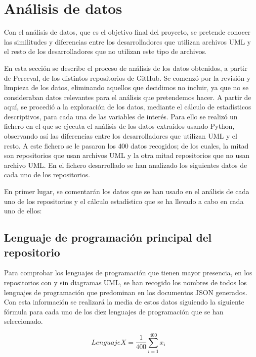 \documentclass[a4paper, 12pt]{book}
\begin{document}
\section{Análisis de datos} %
\label{sec:análisis de datos}

Con el análisis de datos, que es el objetivo final del proyecto, se pretende conocer las similitudes y diferencias entre los desarrolladores que utilizan archivos UML y el resto de los desarrolladores que no utilizan este tipo de archivos.


En esta sección se describe el proceso de análisis de los datos obtenidos, a partir de Perceval, de los distintos repositorios de GitHub. 
Se comenzó por la revisión y limpieza de los datos, eliminando aquellos que decidimos no incluir, ya que no se consideraban datos relevantes para el análisis que pretendemos hacer. 
A partir de aquí, se procedió a la exploración de los datos, mediante el cálculo de estadísticos descriptivos, para cada una de las variables de interés. 
Para ello se realizó un fichero en el que se ejecuta el análisis de los datos extraídos usando Python, observando así las diferencias entre los desarrolladores que utilizan UML y el resto.
A este fichero se le pasaron los 400 datos recogidos; de los cuales, la mitad son repositorios que usan archivos UML y la otra mitad repositorios que no usan archivo UML. 
En el fichero desarrollado se han analizado los siguientes datos de cada uno de los repositorios. 


En primer lugar, se comentarán los datos que se han usado en el análisis de cada uno de los repositorios y el cálculo estadístico que se ha llevado a cabo en cada uno de ellos:


\subsection{Lenguaje de programación principal del repositorio} %
\label{sec:lenguaje de programación principal del repositorio}
Para comprobar los lenguajes de programación que tienen mayor presencia, en los repositorios con y sin diagramas UML, se han recogido los nombres de todos los lenguajes de programación que predominan en los documentos JSON generados.
Con esta información se realizará la media de estos datos siguiendo la siguiente fórmula para cada uno de los diez lenguajes de programación que se han seleccionado.


\[{Lenguaje X} = \frac{1}{400} \sum_{i=1}^{400} x_i\]
\end{document}
